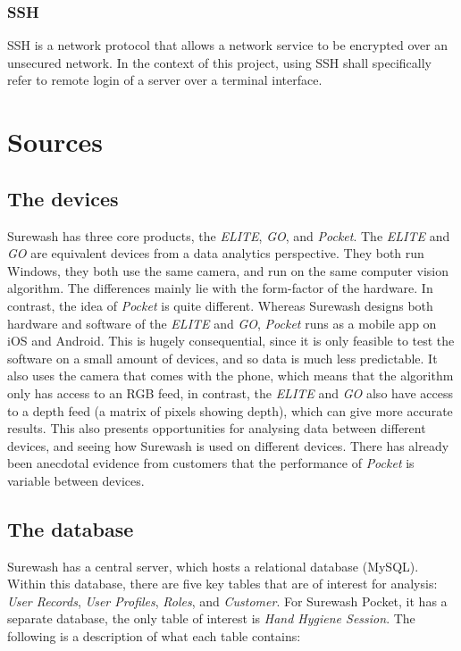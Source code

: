         \subsubsection{SSH} SSH is a network protocol that allows a network service to be encrypted over an unsecured network. In the context of this project, using SSH shall specifically refer to remote login of a server over a terminal interface.


\section{Sources}
    \subsection{The devices} Surewash has three core products, the {\slshape ELITE}, {\slshape GO}, and {\slshape Pocket}. The {\slshape ELITE} and {\slshape GO} are equivalent devices from a data analytics perspective. They both run Windows, they both use the same camera, and run on the same computer vision algorithm. The differences mainly lie with the form-factor of the hardware. In contrast, the idea of {\slshape Pocket} is quite different. Whereas Surewash designs both hardware and software of the {\slshape ELITE} and {\slshape GO}, {\slshape Pocket} runs as a mobile app on iOS and Android. This is hugely consequential, since it is only feasible to test the software on a small amount of devices, and so data is much less predictable. It also uses the camera that comes with the phone, which means that the algorithm only has access to an RGB feed, in contrast, the {\slshape ELITE} and {\slshape GO} also have access to a depth feed (a matrix of pixels showing depth), which can give more accurate results. This also presents opportunities for analysing data between different devices, and seeing how Surewash is used on different devices. There has already been anecdotal evidence from customers that the performance of {\slshape Pocket} is variable between devices.
    \subsection{The database}
    Surewash has a central server, which hosts a relational database (MySQL). Within this database, there are five key tables that are of interest for analysis: {\slshape User Records}, {\slshape User Profiles}, {\slshape Roles}, and {\slshape Customer}. For Surewash Pocket, it has a separate database, the only table of interest is {\slshape Hand Hygiene Session}. The following is a description of what each table contains:

